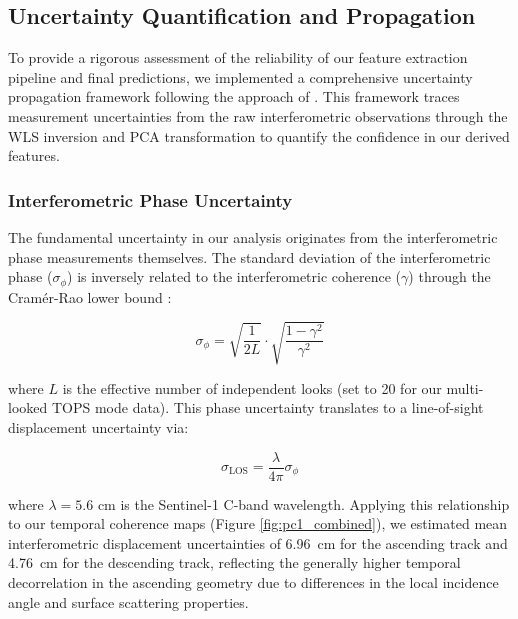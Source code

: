 
\subsection{Uncertainty Quantification and Propagation}
\label{sec:uncertainty_propagation}

To provide a rigorous assessment of the reliability of our feature extraction pipeline and final predictions, we implemented a comprehensive uncertainty propagation framework following the approach of \citet{scitotenv2020}. This framework traces measurement uncertainties from the raw interferometric observations through the WLS inversion and PCA transformation to quantify the confidence in our derived features.

\subsubsection{Interferometric Phase Uncertainty}

The fundamental uncertainty in our analysis originates from the interferometric phase measurements themselves. The standard deviation of the interferometric phase ($\sigma_\phi$) is inversely related to the interferometric coherence ($\gamma$) through the Cramér-Rao lower bound \citep{Ferretti2001}:

\begin{equation}
\sigma_\phi = \sqrt{\frac{1}{2L}} \cdot \sqrt{\frac{1 - \gamma^2}{\gamma^2}}
\end{equation}

\noindent where $L$ is the effective number of independent looks (set to 20 for our multi-looked TOPS mode data). This phase uncertainty translates to a line-of-sight displacement uncertainty via:

\begin{equation}
\sigma_{\text{LOS}} = \frac{\lambda}{4\pi} \sigma_\phi
\end{equation}

\noindent where $\lambda = 5.6$ cm is the Sentinel-1 C-band wavelength. Applying this relationship to our temporal coherence maps (Figure \ref{fig:pc1_combined}), we estimated mean interferometric displacement uncertainties of 6.96~cm for the ascending track and 4.76~cm for the descending track, reflecting the generally higher temporal decorrelation in the ascending geometry due to differences in the local incidence angle and surface scattering properties.

